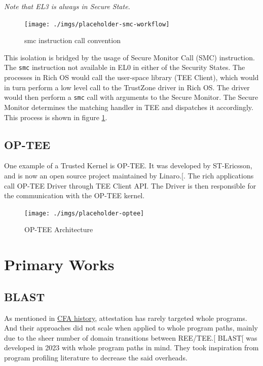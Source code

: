 \documentclass[a4paper, nobind]{templates/ociamthesis}
\begin{document}
\emph{Note that EL3 is always in Secure State.}

\begin{figure}[H]

{\centering \texttt{[image: ./imgs/placeholder-smc-workflow]} 

}

\caption{smc instruction call convention}\label{fig:smc-convention}
\end{figure}

This isolation is bridged by the usage of Secure Monitor Call (SMC) instruction.
The \texttt{smc} instruction not available in EL0 in either of the Security States.
The processes in Rich OS would call the user-space library (TEE Client),
which would in turn perform a low level call to the TrustZone driver in Rich OS.
The driver would then perform a \texttt{smc} call with arguments to the Secure Monitor.
The Secure Monitor determines the matching handler in TEE and dispatches it accordingly.
This process is shown in figure \ref{fig:smc-convention}.

\subsection{OP-TEE}\label{op-tee}

One example of a Trusted Kernel is OP-TEE. It was developed by ST-Ericsson,
and is now an open source project maintained by Linaro.{[}\citeproc{ref-optee}{15}{]}.
The rich applications call OP-TEE Driver through TEE Client API. The Driver
is then responsible for the communication with the OP-TEE kernel.

\begin{figure}[H]

{\centering \texttt{[image: ./imgs/placeholder-optee]} 

}

\caption{OP-TEE Architecture}\label{fig:optee-arch}
\end{figure}

\section{Primary Works}\label{primary-works}

\subsection{BLAST}\label{blast}

As mentioned in \hyperref[cfahistory]{CFA history}, attestation has rarely targeted whole programs.
And their approaches did not scale when applied to whole program paths, mainly
due to the sheer number of domain transitions between REE/TEE.{[}\citeproc{ref-blast}{22}{]}
BLAST{[}\citeproc{ref-blast}{22}{]} was developed in 2023 with whole program paths in mind.
They took inspiration from program profiling literature to decrease the said overheads.
\end{document}
